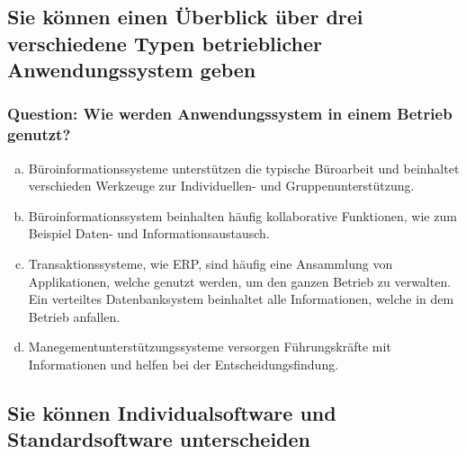 \documentclass{article}
\begin{document}
\begin{adjustwidth}{2em}{2em}
\begin{adjustwidth}{2em}{2em}
			\subsection{Sie können einen Überblick über drei verschiedene Typen betrieblicher Anwendungssystem geben}
			\begin{adjustwidth}{1em}{}
				\subsubsection*{Question: Wie werden Anwendungssystem in einem Betrieb genutzt?}
				\begin{adjustwidth}{1em}{}
					\begin{enumerate}[(a)]
						\item Büroinformationssysteme unterstützen die typische Büroarbeit und beinhaltet verschieden Werkzeuge zur Individuellen- und Gruppenunterstützung.
						\item Büroinformationssystem beinhalten häufig kollaborative Funktionen, wie zum Beispiel Daten- und Informationsaustausch.
						\item Transaktionssysteme, wie ERP, sind häufig eine Ansammlung von Applikationen, welche genutzt werden, um den ganzen Betrieb zu verwalten. Ein verteiltes Datenbanksystem beinhaltet alle Informationen, welche in dem Betrieb anfallen.
						\item Manegementunterstützungssysteme versorgen Führungskräfte mit Informationen und helfen bei der Entscheidungsfindung.
					\end{enumerate}
				\end{adjustwidth}
			\end{adjustwidth}
			\subsection{Sie können Individualsoftware und Standardsoftware unterscheiden}
			\begin{adjustwidth}{1em}{}

\end{adjustwidth}
\end{adjustwidth}
\end{adjustwidth}
\end{document}

